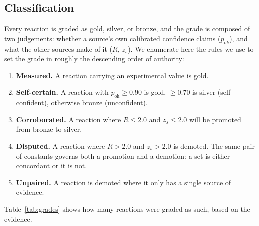 \documentclass[11pt]{article}
\begin{document}
\subsection{Classification} Every reaction is graded as gold, silver, or bronze, and the grade is composed of two judgements: whether a source's own calibrated confidence claims ($p_{ok}$), and what the other sources make of it ($R$, $z_s$). We enumerate here the rules we use to set the grade in roughly the descending order of authority: 

\begin{enumerate} \item \textbf{Measured.} A reaction carrying an experimental value is gold. 

    \item \textbf{Self-certain.} A reaction with $p_{\text{ok}} \ge 0.90$ is gold, $\ge 0.70$ is silver (self-confident), otherwise bronze (unconfident). 

    \item \textbf{Corroborated.} A reaction where $R \le 2.0$ and $z_s \le 2.0$ will be promoted from bronze to silver.

    \item \textbf{Disputed.} A reaction where $R > 2.0$ and $z_s > 2.0$ is demoted. The same pair of constants governs both a promotion and a demotion: a set is either concordant or it is not. 

    \item \textbf{Unpaired.} A reaction is demoted where it only has a single source of evidence. \end{enumerate}
Table~\ref{tab:grades} shows how many reactions were graded as such, based on the evidence.
\end{document}
